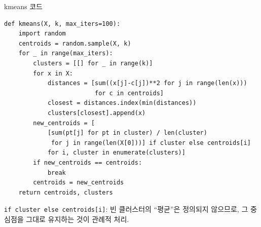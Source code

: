 \documentclass[aspectratio=169,11pt]{beamer}
\begin{document}

\begin{frame}[fragile]{kmeans 코드}
\begin{lstlisting}
def kmeans(X, k, max_iters=100):
    import random
    centroids = random.sample(X, k)
    for _ in range(max_iters):
        clusters = [[] for _ in range(k)]
        for x in X:
            distances = [sum((x[j]-c[j])**2 for j in range(len(x)))
                         for c in centroids]
            closest = distances.index(min(distances))
            clusters[closest].append(x)
        new_centroids = [
            [sum(pt[j] for pt in cluster) / len(cluster)
             for j in range(len(X[0]))] if cluster else centroids[i]
            for i, cluster in enumerate(clusters)]
        if new_centroids == centroids:
            break
        centroids = new_centroids
    return centroids, clusters
\end{lstlisting}
  {\footnotesize \texttt{if cluster else centroids[i]}: 빈
  클러스터의 ``평균''은 정의되지 않으므로, 그 중심점을 그대로
  유지하는 것이 관례적 처리.}
\end{frame}

\end{document}
